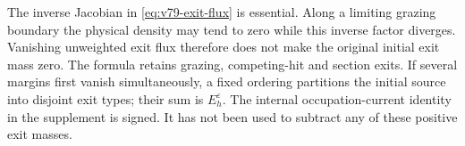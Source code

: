 The inverse Jacobian in \eqref{eq:v79-exit-flux} is essential. Along
a limiting grazing boundary the physical density may tend to zero
while this inverse factor diverges. Vanishing unweighted exit flux
therefore does not make the original initial exit mass zero. The
formula retains grazing, competing-hit and section exits. If several
margins first vanish simultaneously, a fixed ordering partitions the
initial source into disjoint exit types; their sum is $E_h^\varepsilon$.
The internal occupation-current identity in the supplement is signed.
It has not been used to subtract any of these positive exit masses.
